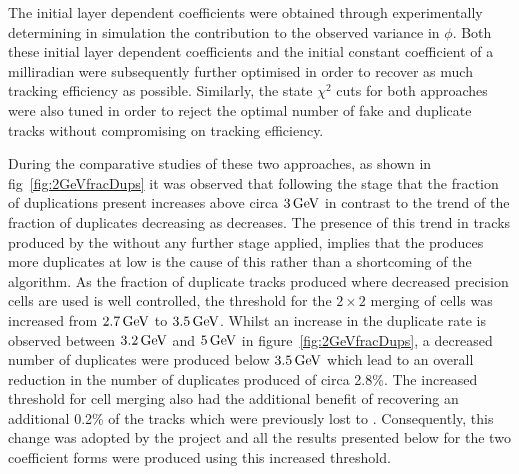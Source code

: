 The initial layer dependent coefficients were obtained through experimentally determining in simulation the \MS contribution to the observed variance in $\phi$.
Both these initial layer dependent coefficients and the initial constant coefficient of a milliradian were subsequently further optimised in order to recover as much tracking efficiency as  possible.
Similarly, the \KF state $\chi^{2}$ cuts for both approaches were also tuned in order to reject the optimal number of fake and duplicate tracks without compromising on tracking efficiency.

During the comparative studies of these two approaches, as shown in fig~\ref{fig:2GeVfracDups} it was observed that following the \DR stage that the fraction of duplications present increases above circa $3\,\text{Ge\hspace{-.08em}V}$ in contrast to the trend of the fraction of duplicates decreasing as \pT decreases.
The presence of this trend in tracks produced by the \HT without any further stage applied, implies that the \HT produces more duplicates at low \pT is the cause of this rather than a shortcoming of the \DR algorithm.
As the fraction of duplicate tracks produced where decreased precision \HT cells are used is well controlled, the \pT threshold for the $2 \times 2$ merging of \HT cells was increased from $2.7\,\text{Ge\hspace{-.08em}V}$ to $3.5\,\text{Ge\hspace{-.08em}V}$.
Whilst an increase in the duplicate rate is observed between $3.2\,\text{Ge\hspace{-.08em}V}$ and $5\,\text{Ge\hspace{-.08em}V}$ in figure~\ref{fig:2GeVfracDups}, a decreased number of duplicates were produced below $3.5\,\text{Ge\hspace{-.08em}V}$ which lead to an overall reduction in the number of duplicates produced of circa 2.8\%.
The increased \pT threshold for \HT cell merging also had the additional benefit of recovering an additional 0.2\% of the tracks which were previously lost to \MS.
Consequently, this change was adopted by the project and all the results presented below for the two \MS coefficient forms were produced using this increased threshold. 

